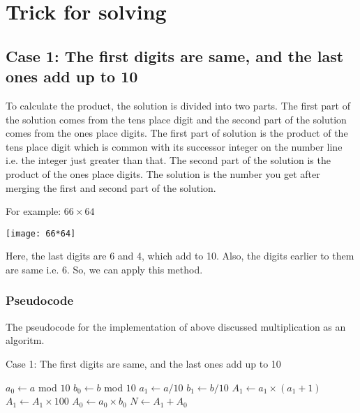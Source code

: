 \documentclass[12pt]{article}
\begin{document}
\section{Trick for solving}
\subsection{Case 1: The first digits are same, and the last ones add up to 10}

To calculate the product, the solution is divided into two parts. The first part of the solution comes from the tens place digit and the second part of the solution comes from the ones place digits. The first part of solution is the product of the tens place digit which is common with its successor integer on the number line i.e. the integer just greater than that. The second part of the solution is the product of the ones place digits. The solution is the number you get after merging the first and second part of the solution.~\cite{mul1}

\vspace{5mm}

\hspace{-17pt}For example: $66 \times 64$\newline
\begin{center}
\texttt{[image: 66*64]}\newline
\end{center}

\hspace{-17pt}Here, the last digits are 6 and 4, which add to 10. Also, the digits earlier to them are same i.e. 6. So,
we can apply this method.

\subsubsection{Pseudocode}
The pseudocode for the implementation of above discussed multiplication as an algoritm.

\begin{enumerate}

  \begin{algorithm}[H]
   \caption{Case 1: The first digits are same, and the last ones add up to 10}
    \begin{algorithmic}[1]
       

        \State $a_0 \leftarrow a$ mod $10$
        \State $b_0 \leftarrow b$ mod $10$
        \State $a_1 \leftarrow a/10$
        \State $b_1 \leftarrow b/10$
            \Else 
                \State $A_1 \leftarrow a_1 \times (a_1 + 1)$
                \State $A_1 \leftarrow A_1 \times 100$
        		\State $A_0 \leftarrow a_0 \times b_0$
        		\State $N \leftarrow A_1 + A_0$
        	\EndIf

       \EndFunction

\end{algorithmic}
\end{algorithm}
\end{enumerate}
\end{document}

